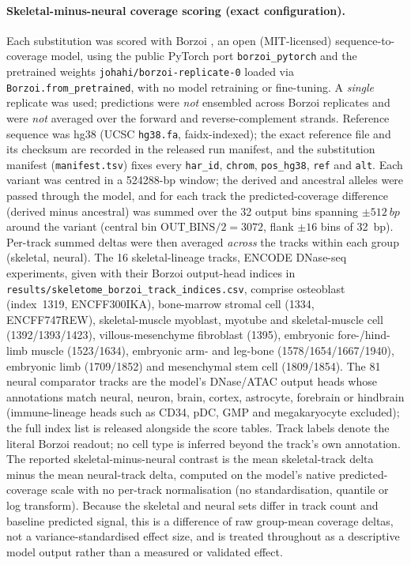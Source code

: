 \documentclass[11pt]{article}
\begin{document}
\paragraph{Skeletal-minus-neural coverage scoring (exact configuration).}
Each substitution was scored with Borzoi \citep{linder2025borzoi}, an open (MIT-licensed)
sequence-to-coverage model, using the public PyTorch port \texttt{borzoi\_pytorch} and the
pretrained weights \texttt{johahi/borzoi-replicate-0} loaded via
\texttt{Borzoi.from\_pretrained}, with no model retraining or fine-tuning. A \emph{single}
replicate was used; predictions were \emph{not} ensembled across Borzoi replicates and were
\emph{not} averaged over the forward and reverse-complement strands. Reference sequence was hg38
(UCSC \texttt{hg38.fa}, faidx-indexed); the exact reference file and its checksum are recorded in
the released run manifest, and the substitution manifest (\texttt{manifest.tsv}) fixes every
\texttt{har\_id}, \texttt{chrom}, \texttt{pos\_hg38}, \texttt{ref} and \texttt{alt}. Each variant
was centred in a \num{524288}-bp window; the derived and ancestral alleles were passed through the
model, and for each track the predicted-coverage difference (derived minus ancestral) was
summed over the \num{32} output bins spanning $\pm\SI{512}{bp}$ around the variant (central bin
$\text{OUT\_BINS}/2=3072$, flank $\pm16$ bins of \SI{32}{bp}). Per-track summed deltas were then
averaged \emph{across} the tracks within each group (skeletal, neural). The \num{16}
skeletal-lineage tracks, ENCODE DNase-seq experiments, given with their Borzoi output-head
indices in \texttt{results/skeletome\_borzoi\_track\_indices.csv}, comprise osteoblast (index~1319,
ENCFF300IKA), bone-marrow stromal cell (1334, ENCFF747REW), skeletal-muscle myoblast, myotube and
skeletal-muscle cell (1392/1393/1423), villous-mesenchyme fibroblast (1395), embryonic fore-/hind-limb
muscle (1523/1634), embryonic arm- and leg-bone (1578/1654/1667/1940), embryonic limb (1709/1852)
and mesenchymal stem cell (1809/1854). The \num{81} neural comparator tracks are the model's
DNase/ATAC output heads whose annotations match neural, neuron, brain, cortex, astrocyte, forebrain
or hindbrain (immune-lineage heads such as CD34, pDC, GMP and megakaryocyte excluded); the full
index list is released alongside the score tables. Track labels denote the literal Borzoi readout;
no cell type is inferred beyond the track's own annotation. The reported skeletal-minus-neural
contrast is the mean skeletal-track delta minus the mean neural-track delta, computed on the model's
native predicted-coverage scale with no per-track normalisation (no standardisation, quantile or log
transform). Because the skeletal and neural sets differ in track count and baseline predicted signal,
this is a difference of raw group-mean coverage deltas, not a variance-standardised effect size, and
is treated throughout as a descriptive model output rather than a measured or validated effect.
\end{document}
